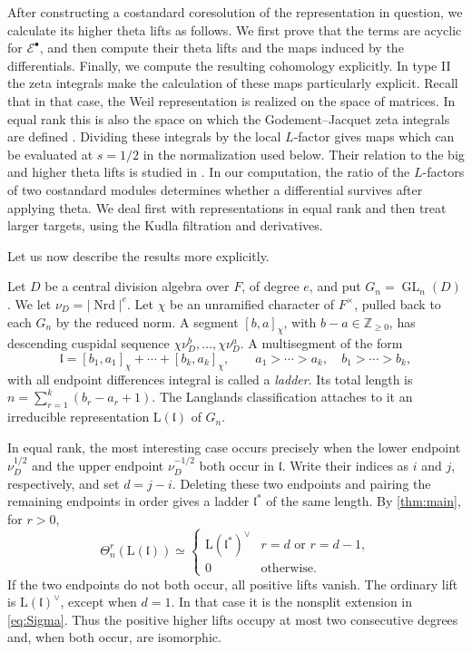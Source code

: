 \documentclass[10pt,a4paper]{article}
\theoremstyle{definition}
\theoremstyle{remark}
\numberwithin{equation}{section}
\newcommand{\ZZ}{\mathbb{Z}}
\newcommand{\fl}{\mathfrak{l}}
\newcommand{\Lrep}{\mathrm{L}}
\DeclareMathOperator{\GL}{GL}
\begin{document}
After constructing a costandard coresolution of the representation in
question, we calculate its higher theta lifts as follows.
We first prove that the terms are acyclic for $\mathcal E^\bullet$, and then compute their theta lifts and the maps induced by the
differentials. Finally, we compute the resulting cohomology explicitly.
In type II the zeta integrals make the calculation of these maps
particularly explicit.
Recall that in that case, the Weil representation is realized on the space of
matrices. In equal rank this is also the space on which the
Godement--Jacquet zeta integrals are defined \cite{GJ1972}.
Dividing these integrals by the local $L$-factor gives maps which can
be evaluated at $s=1/2$ in the normalization used below. Their relation to the big and higher theta
lifts is studied in \cite{FSX2018,CLLTZ2025}. In our computation,
the ratio of the $L$-factors of two costandard modules determines
whether a differential survives after applying theta.
We deal first with representations in equal rank and then treat larger targets, using the
Kudla filtration and derivatives.

Let us now describe the results more explicitly.

Let $D$ be a central division algebra over $F$, of degree $e$, and
put $G_n=\GL_n(D)$. We let
$\nu_D=|\operatorname{Nrd}|^e$. Let $\chi$ be an unramified character
of $F^\times$, pulled back to each $G_n$ by the reduced norm.
A segment $[b,a]_\chi$, with $b-a\in\ZZ_{\geq0}$, has descending
cuspidal sequence
$\chi\nu_D^b,\ldots,\chi\nu_D^a$. A multisegment of the form
\[
 \fl=[b_1,a_1]_\chi+\cdots+[b_k,a_k]_\chi,\qquad
 a_1>\cdots>a_k,\quad b_1>\cdots>b_k,
\]
with all endpoint differences integral is called a \emph{ladder}.
Its total length is
$n=\sum_{r=1}^k(b_r-a_r+1)$. The Langlands classification attaches
to it an irreducible representation $\Lrep(\fl)$ of $G_n$.

In equal rank, the most interesting case occurs precisely when the lower
endpoint $\nu_D^{1/2}$ and the upper endpoint $\nu_D^{-1/2}$ both
occur in $\fl$. Write their indices as $i$ and $j$, respectively, and set
$d=j-i$. Deleting these two endpoints and pairing the remaining
endpoints in order gives a ladder $\fl^*$ of the same length.
By \cref{thm:main}, for $r>0$,
\[
 \Theta_n^r(\Lrep(\fl))\simeq
 \begin{cases}
  \Lrep(\fl^*)^\vee&r=d\text{ or }r=d-1,\\
  0&\text{otherwise}.
 \end{cases}
\]
If the two endpoints do not both occur, all positive lifts vanish.
The ordinary lift is $\Lrep(\fl)^\vee$, except when $d=1$. In that
case it is the nonsplit extension in \eqref{eq:Sigma}.
Thus the positive higher lifts occupy at most two consecutive degrees
and, when both occur, are isomorphic.
\end{document}
